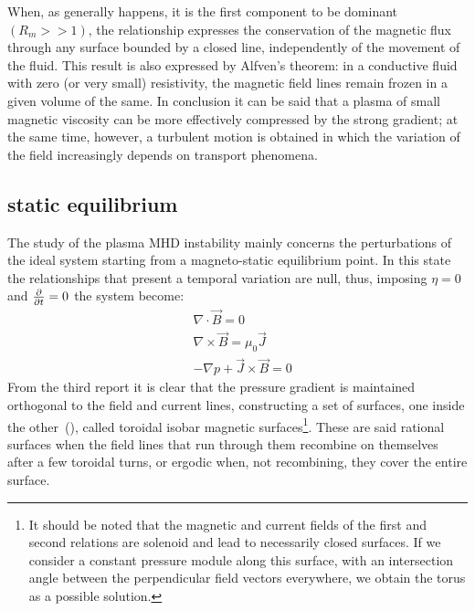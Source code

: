 When, as generally happens, it is the first component to be dominant $(R_m >> 1)$, the relationship expresses the conservation of the magnetic flux through any surface bounded by a closed line, independently of the movement of the fluid. This result is also expressed by Alfven's theorem: in a conductive fluid with zero (or very small) resistivity, the magnetic field lines remain frozen in a given volume of the same.
In conclusion it can be said that a plasma of small magnetic viscosity can be more effectively compressed by the strong gradient; at the same time, however, a turbulent motion is obtained in which the variation of the field increasingly depends on transport phenomena.




\subsection{static equilibrium}
The study of the plasma MHD instability mainly concerns the perturbations of the ideal system starting from a magneto-static equilibrium point. In this state the relationships that present a temporal variation are null, thus, imposing $\eta=0$ and $\pdv{}{t} = 0$ the system become:
\begin{align}
    & \nabla \cdot \Vec{B} = 0 \\
    & \nabla \times \Vec{B} = \mu_0 \Vec{J} \\
    & -\nabla p + \Vec{J} \times \Vec{B} = 0
\end{align}
From the third report it is clear that the pressure gradient is maintained orthogonal to the field and current lines, constructing a set of surfaces, one inside the other~(\Figure{}), called toroidal isobar magnetic surfaces\footnote{It should be noted that the magnetic and current fields of the first and second relations are solenoid and lead to necessarily closed surfaces. If we consider a constant pressure module along this surface, with an intersection angle between the perpendicular field vectors everywhere, we obtain the torus as a possible solution.}. These are said rational surfaces when the field lines that run through them recombine on themselves after a few toroidal turns, or ergodic when, not recombining, they cover the entire surface.

